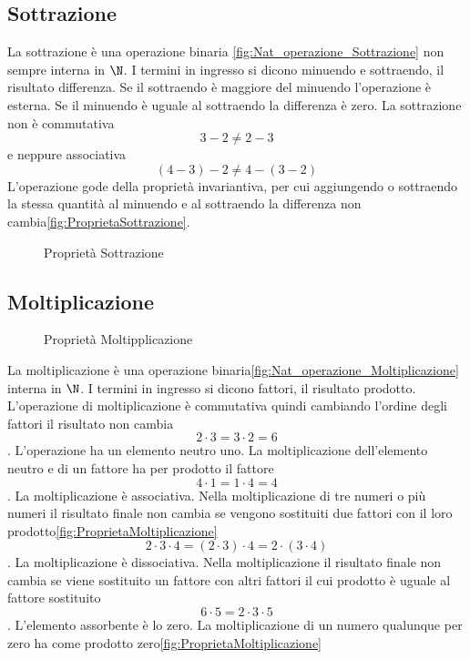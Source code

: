 \subsection{Sottrazione}
\label{sec:NumerinatDiff}
La sottrazione è una operazione binaria \nobs\vref{fig:Nat_operazione_Sottrazione} non sempre interna in $\N$. I termini in ingresso si dicono minuendo e sottraendo, il risultato differenza. Se il sottraendo è maggiore del minuendo l'operazione è esterna. Se il minuendo è uguale al sottraendo la differenza è zero. La sottrazione non è commutativa \[3-2\neq2-3\] e neppure associativa \[(4-3)-2\neq4-(3-2)\]
 L'operazione gode della proprietà invariantiva, per cui aggiungendo o sottraendo la stessa quantità al minuendo e al sottraendo la differenza non cambia\nobs\vref{fig:ProprietaSottrazione}.  
\begin{figure} %
	\centering

	\caption{Proprietà Sottrazione}
	\label{fig:ProprietaSottrazione}\end{figure}
\subsection{Moltiplicazione}
\label{sec:NumerinatMolt}
\begin{figure} %
	\centering

	\caption{Proprietà Moltipplicazione}
	\label{fig:ProprietaMoltiplicazione}\end{figure}
La moltiplicazione è una operazione binaria\nobs\vref{fig:Nat_operazione_Moltiplicazione}  interna in $\N$. I termini in ingresso si dicono fattori, il risultato prodotto. L'operazione di moltiplicazione  è commutativa quindi cambiando l'ordine degli fattori il risultato non cambia \[2\cdot3=3\cdot2=6\]. L'operazione ha un elemento neutro uno. La moltiplicazione dell'elemento neutro e di un fattore ha per prodotto il fattore  \[4\cdot1=1\cdot4=4\]. La moltiplicazione è associativa. Nella moltiplicazione di tre numeri o più numeri il risultato finale non cambia se vengono sostituiti due fattori con il loro prodotto\nobs\vref{fig:ProprietaMoltiplicazione} \[2\cdot3\cdot4=(2\cdot3)\cdot4=2\cdot(3\cdot4)\]. La moltiplicazione è dissociativa. Nella moltiplicazione  il risultato finale non cambia se viene sostituito un fattore con altri fattori il cui prodotto è uguale al fattore sostituito  \[6\cdot5=2\cdot3\cdot5\]. L'elemento assorbente è lo zero. La moltiplicazione di un numero qualunque per zero ha come prodotto zero\nobs\vref{fig:ProprietaMoltiplicazione}
